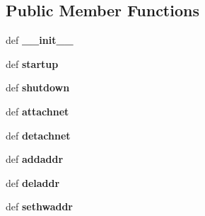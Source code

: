 \subsection*{Public Member Functions}
\begin{DoxyCompactItemize}
\item 
\hypertarget{classcore_1_1bsd_1_1vnode_1_1_v_eth_aa9a7fc2faddbb7bff81c4ba865907dba}{def {\bfseries \+\_\+\+\_\+init\+\_\+\+\_\+}}\label{classcore_1_1bsd_1_1vnode_1_1_v_eth_aa9a7fc2faddbb7bff81c4ba865907dba}

\item 
\hypertarget{classcore_1_1bsd_1_1vnode_1_1_v_eth_a679f9397213a8ba3f577d0fc0e99e0a0}{def {\bfseries startup}}\label{classcore_1_1bsd_1_1vnode_1_1_v_eth_a679f9397213a8ba3f577d0fc0e99e0a0}

\item 
\hypertarget{classcore_1_1bsd_1_1vnode_1_1_v_eth_a129b01de4cbd0183aac49376d11d5b13}{def {\bfseries shutdown}}\label{classcore_1_1bsd_1_1vnode_1_1_v_eth_a129b01de4cbd0183aac49376d11d5b13}

\item 
\hypertarget{classcore_1_1bsd_1_1vnode_1_1_v_eth_a5eeb1cad7afc584868559d0dc04aad96}{def {\bfseries attachnet}}\label{classcore_1_1bsd_1_1vnode_1_1_v_eth_a5eeb1cad7afc584868559d0dc04aad96}

\item 
\hypertarget{classcore_1_1bsd_1_1vnode_1_1_v_eth_ab59f1d3781362225d32c61ccea6bbfc5}{def {\bfseries detachnet}}\label{classcore_1_1bsd_1_1vnode_1_1_v_eth_ab59f1d3781362225d32c61ccea6bbfc5}

\item 
\hypertarget{classcore_1_1bsd_1_1vnode_1_1_v_eth_acf93d83b33c83ad1b32e53a37b45b271}{def {\bfseries addaddr}}\label{classcore_1_1bsd_1_1vnode_1_1_v_eth_acf93d83b33c83ad1b32e53a37b45b271}

\item 
\hypertarget{classcore_1_1bsd_1_1vnode_1_1_v_eth_ac4ce2e50a36b92eed922a9b6b943194a}{def {\bfseries deladdr}}\label{classcore_1_1bsd_1_1vnode_1_1_v_eth_ac4ce2e50a36b92eed922a9b6b943194a}

\item 
\hypertarget{classcore_1_1bsd_1_1vnode_1_1_v_eth_a38a38641a17ce726949e2c3870ea5279}{def {\bfseries sethwaddr}}\label{classcore_1_1bsd_1_1vnode_1_1_v_eth_a38a38641a17ce726949e2c3870ea5279}

\end{DoxyCompactItemize}

